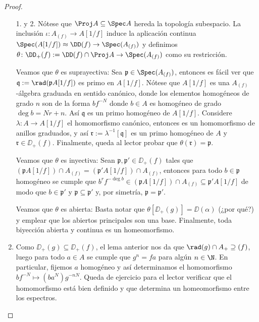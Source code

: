 \begin{proof}
	\begin{enumerate}
		\item[\rm 1. y 2.] Nótese que $\Proj A \subseteq \Spec A$ hereda la topología subespacio.
			La inclusión $\iota \colon A_{(f)} \to A[1/f ]$ induce la aplicación continua
			$\Spec(A[1/f ]) \approx \DD(f ) \to \Spec(A_{(f)})$ y definimos $\theta \colon \DD_+(f ) := \DD(f )\cap \Proj A \to \Spec(A_{(f)})$
			como su restricción.

			Veamos que $\theta$ es suprayectiva: Sea $\mathfrak{p} \in \Spec(A_{(f)} )$, entonces es fácil
			ver que $\mathfrak{q} := \rad(\mathfrak{p} A[1/f])$ es primo en $A[1/f]$.
			Nótese que $A[1/f]$ es una $A_{(f)}$-álgebra graduada en sentido canónico, donde los elementos homogéneos de grado $n$ son
			de la forma $bf^{-N}$ donde $b \in A$ es homogéneo de grado $\deg b = N r + n$.
			Así $\mathfrak{q}$ es un primo homogéneo de $A[1/f]$.
			Considere $\lambda \colon A \to A[1/f ]$ el homomorfismo canónico, entonces es un homomorfismo de anillos graduados,
			y así $\mathfrak{r} := \lambda^{-1}[\mathfrak{q}]$ es un primo homogéneo de $A$ y $\mathfrak{r} \in \DD_+(f)$.
			Finalmente, queda al lector probar que $\theta(\mathfrak{r}) = \mathfrak{p}$.

			Veamos que $\theta$ es inyectiva: Sean $\mathfrak{p}, \mathfrak{p}' \in \DD_+(f )$ tales que $(\mathfrak{p} A[1/f]) \cap A_{(f)}
			= (\mathfrak{p}' A[1/f ]) \cap A_{(f)}$, entonces para todo $b \in \mathfrak{p}$ homogéneo se cumple que
			$b^r f^{-\deg b} \in (\mathfrak{p}A[1/f]) \cap A_{(f)} \subseteq \mathfrak{p}' A[1/f]$ de modo que $b \in \mathfrak{p}'$
			y $\mathfrak{p \subseteq p}'$ y, por simetría, $\mathfrak{p = p}'$.

			Veamos que $\theta$ es abierta: Basta notar que $\theta[\DD_+(g)] = \DD(\alpha)$ (¿por qué?)
			y emplear que los abiertos principales son una base. Finalmente, toda
			biyección abierta y continua es un homeomorfismo.

		\item Como $\DD_+(g) \subseteq \DD_+(f )$, el lema anterior nos da que $\rad(g)\cap A_+ \supseteq (f)$,
			luego para todo $a \in A$ se cumple que $g^n = f a$ para algún $n \in \N$.
			En particular, fijemos $a$ homogéneo y así determinamos el homomorfismo $bf^{-N} \mapsto (ba^N)g^{-nN}$.
			Queda de ejercicio para el lector verificar que el homomorfismo está bien definido y que determina un homeomorfismo entre los espectros.
			\qedhere
	\end{enumerate}
\end{proof}

